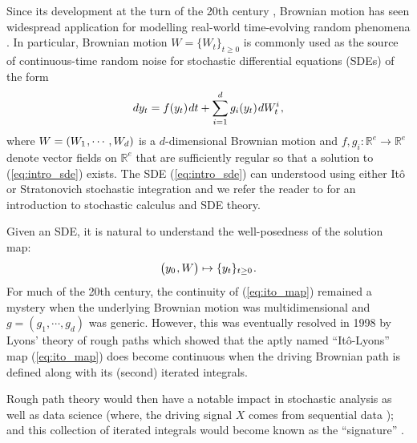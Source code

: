 \documentclass[sn-mathphys-num]{sn-jnl}%
\newcommand{\R}{\mathbb{R}}
\newcommand{\m}{\hspace{0.25mm}}
\begin{document}
Since its development at the turn of the 20th century \cite{bachelier1900bm, einstein1905bm}, Brownian motion has seen widespread application for modelling real-world time-evolving random phenomena \cite{mazo2002bm}.
In particular, Brownian motion $W = \{W_t\}_{t\geq 0}$ is commonly used as the source of continuous-time random noise for stochastic differential equations (SDEs) of the form
\begin{align}\label{eq:intro_sde}
dy_t = f(y_t)\m dt + \sum_{i=1}^d g_i(y_t)\m dW_t^i\m,
\end{align}
where $W = (W_1\m, \cdots, W_d)$ is a $d$-dimensional Brownian motion and $f, g_i : \R^e \rightarrow \R^e$ denote vector fields on $\R^e$ that are  sufficiently regular so that a solution to (\ref{eq:intro_sde}) exists.
The SDE (\ref{eq:intro_sde}) can understood using either It\^{o} or Stratonovich stochastic integration and we refer the reader to \cite{oksendal2010sdes} for an introduction to stochastic calculus and SDE theory.\smallbreak

Given an SDE, it is natural to understand the well-posedness of the solution map:
\begin{align}\label{eq:ito_map}
\big(y_0\m, W\big) \mapsto \{y_t\}_{t\geq 0}\m.
\end{align}
For much of the 20th century, the continuity of (\ref{eq:ito_map}) remained a mystery when the underlying Brownian motion was multidimensional and $g = (g_1,\cdots, g_d)$ was generic.
However, this was eventually resolved in 1998 by Lyons' theory of rough paths \cite{lyons1998roughpaths} which showed that the aptly named ``It\^{o}-Lyons'' map (\ref{eq:ito_map}) does become continuous when the driving Brownian path is defined along with its (second) iterated integrals.\smallbreak

Rough path theory would then have a notable impact in stochastic analysis \cite{frizhairer2020roughpaths, frizvictoir2010roughpaths} as well as data science (where, the driving signal $X$ comes from sequential data \cite{kidger2020ncdes});
and this collection of iterated integrals would become known as the ``signature'' \cite{hambly2010roughpaths, morrill2021nrdes}.\medbreak
\end{document}
